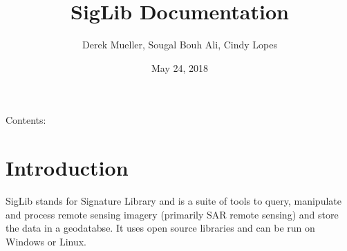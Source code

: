 \documentclass[letterpaper,10pt,english]{sphinxmanual}
\title{SigLib Documentation}
\date{May 24, 2018}
\author{Derek Mueller, Sougal Bouh Ali, Cindy Lopes}
\begin{document}
\maketitle
\tableofcontents
{}\label{index::doc}


Contents:


\chapter{Introduction}
\label{intro:introduction}\label{intro:welcome-to-siglib-s-documentation}\label{intro::doc}
SigLib stands for Signature Library and is a suite of tools to query,
manipulate and process remote sensing imagery (primarily SAR remote
sensing) and store the data in a geodatabse. It uses open source
libraries and can be run on Windows or Linux.
\end{document}
